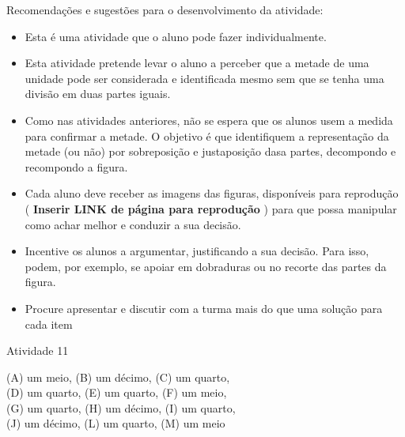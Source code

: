 \documentclass[oneside]{book}
\begin{document}
\begin{multicols}{2}
  Recomendações e sugestões para o desenvolvimento da atividade:
\begin{itemize} %
    \item       Esta é uma atividade que o aluno pode fazer individualmente.
    \item       Esta atividade pretende levar o aluno a perceber que a metade de uma unidade pode ser considerada e identificada mesmo sem que se tenha uma divisão em duas partes iguais.
    \item       Como nas atividades anteriores, não se espera que os alunos usem a medida para confirmar a metade. O objetivo é que identifiquem a representação da metade (ou não) por sobreposição e justaposição dasa partes, decompondo e recompondo a figura.
    \item       Cada aluno deve receber as imagens das figuras, disponíveis para reprodução (      {\bf Inserir LINK de página para reprodução}      ) para que possa manipular como achar melhor e conduzir a sua decisão.
    \item       Incentive os alunos a argumentar, justificando a sua decisão. Para isso, podem, por exemplo, se apoiar em dobraduras ou no recorte das partes da figura.
    \item       Procure apresentar e discutir com a turma mais do que uma solução para cada item
\end{itemize} %





\begin{resposta*}{Atividade 11}

\noindent
(A) um meio,  (B) um décimo, (C) um quarto,\\
(D) um quarto, (E) um quarto, (F) um meio,\\
(G) um quarto, (H) um décimo, (I) um quarto,\\
(J) um décimo, (L) um quarto, (M) um meio
\end{resposta*}



\end{multicols}
\end{document}
